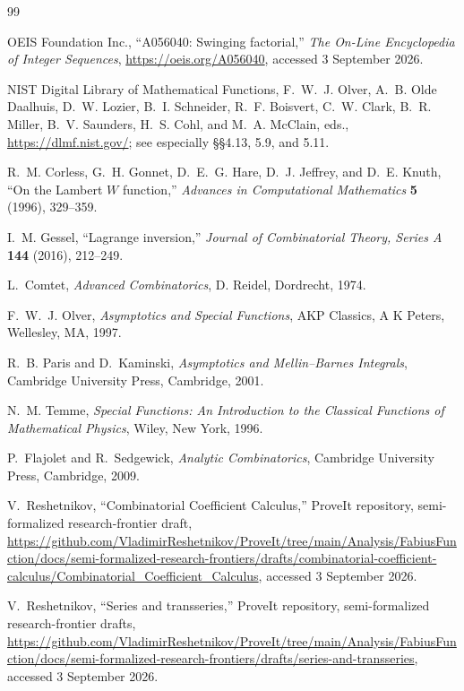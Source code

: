 \documentclass[11pt,a4paper]{article}
\theoremstyle{clean}
\theoremstyle{definition}
\begin{document}
\begin{thebibliography}{99}

OEIS Foundation Inc.,
``A056040: Swinging factorial,''
\emph{The On-Line Encyclopedia of Integer Sequences},
\url{https://oeis.org/A056040}, accessed 3 September 2026.

NIST Digital Library of Mathematical Functions,
F.~W.~J. Olver, A.~B. Olde Daalhuis, D.~W. Lozier, B.~I. Schneider,
R.~F. Boisvert, C.~W. Clark, B.~R. Miller, B.~V. Saunders, H.~S. Cohl,
and M.~A. McClain, eds.,
\url{https://dlmf.nist.gov/}; see especially \S\S4.13, 5.9, and 5.11.

R.~M. Corless, G.~H. Gonnet, D.~E.~G. Hare, D.~J. Jeffrey, and D.~E. Knuth,
``On the Lambert \(W\) function,''
\emph{Advances in Computational Mathematics} \textbf{5} (1996), 329--359.

I.~M. Gessel,
``Lagrange inversion,''
\emph{Journal of Combinatorial Theory, Series A} \textbf{144} (2016), 212--249.

L.~Comtet,
\emph{Advanced Combinatorics},
D. Reidel, Dordrecht, 1974.

F.~W.~J. Olver,
\emph{Asymptotics and Special Functions},
AKP Classics, A K Peters, Wellesley, MA, 1997.

R.~B. Paris and D.~Kaminski,
\emph{Asymptotics and Mellin--Barnes Integrals},
Cambridge University Press, Cambridge, 2001.

N.~M. Temme,
\emph{Special Functions: An Introduction to the Classical Functions of Mathematical Physics},
Wiley, New York, 1996.

P.~Flajolet and R.~Sedgewick,
\emph{Analytic Combinatorics},
Cambridge University Press, Cambridge, 2009.

V.~Reshetnikov,
``Combinatorial Coefficient Calculus,''
ProveIt repository, semi-formalized research-frontier draft,
\url{https://github.com/VladimirReshetnikov/ProveIt/tree/main/Analysis/FabiusFunction/docs/semi-formalized-research-frontiers/drafts/combinatorial-coefficient-calculus/Combinatorial_Coefficient_Calculus},
accessed 3 September 2026.

V.~Reshetnikov,
``Series and transseries,''
ProveIt repository, semi-formalized research-frontier drafts,
\url{https://github.com/VladimirReshetnikov/ProveIt/tree/main/Analysis/FabiusFunction/docs/semi-formalized-research-frontiers/drafts/series-and-transseries},
accessed 3 September 2026.

\end{thebibliography}
\end{document}
